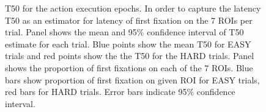 \begin{figure}[h]
    \centering
    \caption[]{ T50 for the action execution epochs. In order to capture the latency T50 as an estimator for latency of first fixation on the 7 ROIs per trial. 
    Panel \protect{} shows the mean and 95\% confidence interval of T50 estimate for each trial. Blue points show the mean T50 for EASY trials and red points show the the T50 for the HARD trials.
    Panel \protect{} shows the proportion of first fixations on each of the 7 ROIs. Blue bars show proportion of first fixation on given ROI for EASY trials, red bars for HARD trials. Error bars indicate 95\% confidence interval.
    }
    \label{figure:t50_subject_exe}
\end{figure}